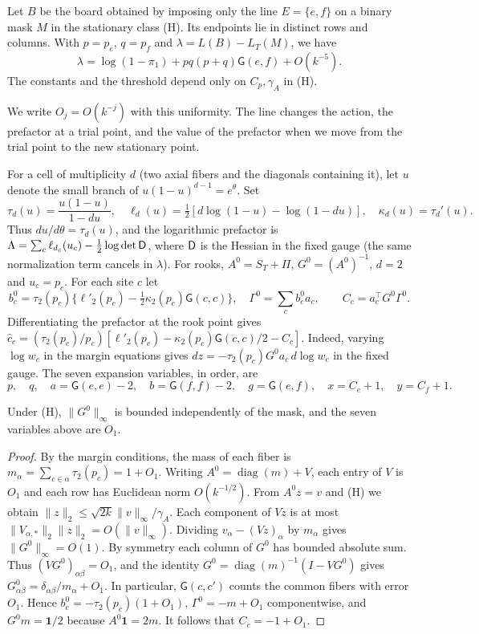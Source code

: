 \begin{proposicion}\label{prop:una-linea}
Let $B$ be the board obtained by imposing only the line $E=\{e,f\}$ on a binary mask $M$ in the
stationary class (H). Its endpoints lie in distinct rows and columns. With $p=p_e$, $q=p_f$ and
$\lambda=L(B)-L_T(M)$, we have
\begin{equation}\label{eq:una-linea}
 \lambda=\log(1-\pi_1)+pq(p+q)\mathsf G(e,f)+O(k^{-5}).
\end{equation}
The constants and the threshold depend only on $C_p,\gamma_A$ in (H).
\end{proposicion}
We write $O_j=O(k^{-j})$ with this uniformity. The line changes the action, the prefactor at a
trial point, and the value of the prefactor when we move from the trial point to the new
stationary point.

For a cell of multiplicity $d$ (two axial fibers and the diagonals containing it), let $u$ denote
the small branch of $u(1-u)^{d-1}=e^\theta$. Set
\[
 \tau_d(u)=\frac{u(1-u)}{1-du},\quad
 \ell_d(u)=\tfrac12[d\log(1-u)-\log(1-du)],\quad \kappa_d(u)=\tau_d'(u).
\]
Thus $du/d\theta=\tau_d(u)$, and the logarithmic prefactor is
$\Lambda=\sum_c\ell_{d_c}(u_c)-\tfrac12\log\det \mathsf D$, where $\mathsf D$ is the Hessian in the
fixed gauge (the same normalization term cancels in $\lambda$). For rooks, $A^0=S_T+\Pi$,
$G^0=(A^0)^{-1}$, $d=2$ and $u_c=p_c$. For each site $c$ let
\[
 b_c^0=\tau_2(p_c)\{\ell'_2(p_c)-\tfrac12\kappa_2(p_c)\mathsf G(c,c)\},\quad
 \Gamma^0=\sum_c b_c^0a_c,\qquad C_c=a_c^\top G^0\Gamma^0 .
\]
Differentiating the prefactor at the rook point gives $\hat c_c=(\tau_2(p_c)/p_c)
[\ell'_2(p_c)-\kappa_2(p_c)\mathsf G(c,c)/2-C_c]$. Indeed, varying $\log w_c$ in the margin
equations gives $dz=-\tau_2(p_c)G^0a_c\,d\log w_c$ in the fixed gauge. The seven expansion
variables, in order, are
\[
 p,\quad q,\quad a=\mathsf G(e,e)-2,\quad b=\mathsf G(f,f)-2,\quad
 g=\mathsf G(e,f),\quad x=C_e+1,\quad y=C_f+1 .
\]
\begin{lema}\label{lem:linea-inversa}
Under (H), $\|G^0\|_\infty$ is bounded independently of the mask, and the seven variables above
are $O_1$.
\end{lema}
\begin{proof}
By the margin conditions, the mass of each fiber is $m_\alpha=\sum_{c\in\alpha}\tau_2(p_c)=1+O_1$.
Writing $A^0=\operatorname{diag}(m)+V$, each entry of $V$ is $O_1$ and each row has Euclidean norm
$O(k^{-1/2})$. From $A^0z=v$ and (H) we obtain $\|z\|_2\le\sqrt{2k}\|v\|_\infty/\gamma_A$. Each
component of $Vz$ is at most $\|V_{\alpha,*}\|_2\|z\|_2=O(\|v\|_\infty)$. Dividing
$v_\alpha-(Vz)_\alpha$ by $m_\alpha$ gives $\|G^0\|_\infty=O(1)$. By symmetry each column of $G^0$
has bounded absolute sum. Thus $(VG^0)_{\alpha\beta}=O_1$, and the identity
$G^0=\operatorname{diag}(m)^{-1}(I-VG^0)$ gives
$G^0_{\alpha\beta}=\delta_{\alpha\beta}/m_\alpha+O_1$. In particular, $\mathsf G(c,c')$ counts the
common fibers with error $O_1$. Hence $b_c^0=-\tau_2(p_c)(1+O_1)$, $\Gamma^0=-m+O_1$
componentwise, and $G^0m=\symbf{1}/2$ because $A^0\symbf{1}=2m$. It follows that $C_c=-1+O_1$.
\end{proof}

